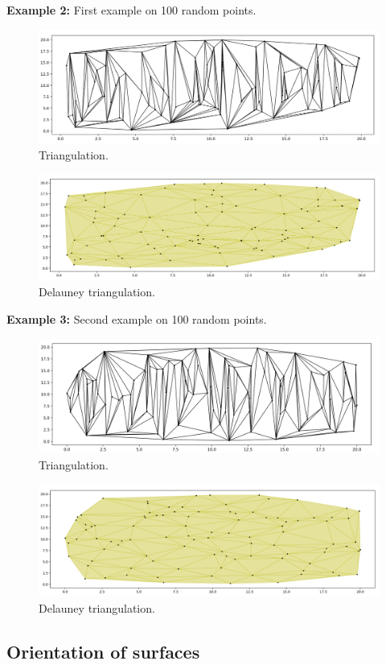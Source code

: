 \documentclass[a4paper,11pt]{article}
\begin{document}
\noindent
\textbf{Example 2:} First example on 100 random points.
\begin{figure}[ht!]
    \centering
    \includegraphics[width=150mm]{del_t1.png}
    \caption{Triangulation.}
\end{figure}
\begin{figure}[ht!]
    \centering
    \includegraphics[width=150mm]{del_d1.png}
    \caption{Delauney triangulation.}
\end{figure}

\newpage
\noindent
\textbf{Example 3:} Second example on 100 random points.
\begin{figure}[ht!]
    \centering
    \includegraphics[width=150mm]{del_t2.png}
    \caption{Triangulation.}
\end{figure}
\begin{figure}[ht!]
    \centering
    \includegraphics[width=150mm]{del_d2.png}
    \caption{Delauney triangulation.}
\end{figure}

\newpage
\subsection{Orientation of surfaces}


\end{document}
